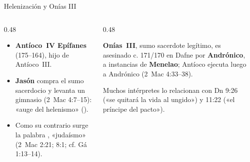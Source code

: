 \begin{frame}{Helenización y Onías III}
\begin{columns}[T,onlytextwidth]
\begin{column}{0.48\textwidth}\footnotesize
\begin{itemize}
\item \textbf{Antíoco~IV Epífanes} (175--164), hijo de Antíoco~III.\medskip
\item \textbf{Jasón} compra el sumo sacerdocio y levanta un gimnasio (2~Mac 4:7--15): «auge del helenismo» ().\medskip
\item Como su contrario surge la palabra , «judaísmo» (2~Mac 2:21; 8:1; cf. Gá 1:13--14).
\end{itemize}
\end{column}
\begin{column}{0.48\textwidth}
\begin{notalam}
\footnotesize\textbf{Onías~III}, sumo sacerdote legítimo, es asesinado c. 171/170 en Dafne por \textbf{Andrónico}, a instancias de \textbf{Menelao}; Antíoco ejecuta luego a Andrónico (2~Mac 4:33--38).\par\smallskip
Muchos intérpretes lo relacionan con Dn 9:26 («se quitará la vida al ungido») y 11:22 («el príncipe del pacto»).
\end{notalam}
\end{column}
\end{columns}
\end{frame}

